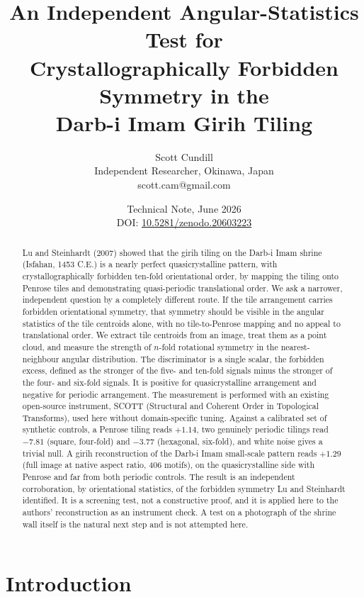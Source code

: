 \documentclass[11pt]{article}
\title{\bfseries An Independent Angular-Statistics Test for\\
Crystallographically Forbidden Symmetry in the\\
Darb-i Imam Girih Tiling}
\author{Scott Cundill\\
\small Independent Researcher, Okinawa, Japan\\
\small scott.cam@gmail.com}
\date{Technical Note, June 2026\\
\small DOI: \href{https://doi.org/10.5281/zenodo.20603223}{10.5281/zenodo.20603223}}
\begin{document}
\maketitle

\begin{abstract}
\noindent
Lu and Steinhardt (2007) showed that the girih tiling on the Darb-i Imam shrine
(Isfahan, 1453 C.E.) is a nearly perfect quasicrystalline pattern, with
crystallographically forbidden ten-fold orientational order, by mapping the
tiling onto Penrose tiles and demonstrating quasi-periodic translational order.
We ask a narrower, independent question by a completely different route. If the
tile arrangement carries forbidden orientational symmetry, that symmetry should
be visible in the angular statistics of the tile centroids alone, with no
tile-to-Penrose mapping and no appeal to translational order. We extract tile
centroids from an image, treat them as a point cloud, and measure the strength
of $n$-fold rotational symmetry in the nearest-neighbour angular distribution.
The discriminator is a single scalar, the forbidden excess, defined as the
stronger of the five- and ten-fold signals minus the stronger of the four- and
six-fold signals. It is positive for quasicrystalline arrangement and negative
for periodic arrangement. The measurement is performed with an existing
open-source instrument, SCOTT (Structural and Coherent Order in Topological
Transforms), used here without domain-specific tuning. Against a calibrated set
of synthetic controls, a Penrose tiling reads $+1.14$, two genuinely periodic
tilings read $-7.81$ (square, four-fold) and $-3.77$ (hexagonal, six-fold), and
white noise gives a trivial null. A girih reconstruction of the Darb-i Imam
small-scale pattern reads $+1.29$ (full image at native aspect ratio, 406
motifs), on the quasicrystalline side with Penrose and far from both periodic
controls. The result is an independent corroboration, by
orientational statistics, of the forbidden symmetry Lu and Steinhardt identified.
It is a screening test, not a constructive proof, and it is applied here to the
authors' reconstruction as an instrument check. A test on a photograph of the
shrine wall itself is the natural next step and is not attempted here.
\end{abstract}

\section{Introduction}
\end{document}
